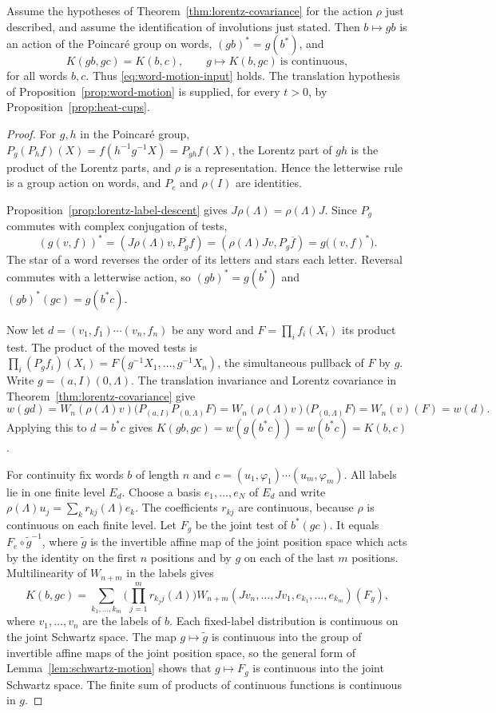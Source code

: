 \begin{corollary}
\label{cor:word-motion-inputs}
Assume the hypotheses of Theorem~\ref{thm:lorentz-covariance} for the
action $\rho$ just described, and assume the identification of involutions
just stated. Then $b\mapsto gb$ is an action of the Poincar\'e group on
words, $(gb)^*=g(b^*)$, and
\[
 K(gb,gc)=K(b,c),\qquad g\longmapsto K(b,gc)\ \text{is continuous},
\]
for all words $b,c$. Thus \eqref{eq:word-motion-input} holds. The
translation hypothesis of Proposition~\ref{prop:word-motion} is supplied,
for every $t>0$, by Proposition~\ref{prop:heat-cups}.
\end{corollary}
\begin{proof}
For $g,h$ in the Poincar\'e group,
$P_g(P_hf)(X)=f(h^{-1}g^{-1}X)=P_{gh}f(X)$, the Lorentz part of $gh$ is
the product of the Lorentz parts, and $\rho$ is a representation. Hence
the letterwise rule is a group action on words, and $P_e$ and $\rho(I)$
are identities.

Proposition~\ref{prop:lorentz-label-descent} gives $J\rho(\Lambda)=\rho(\Lambda)J$.
Since $P_g$ commutes with complex conjugation of tests,
\[
 (g(v,f))^*=(J\rho(\Lambda)v,\overline{P_gf})
          =(\rho(\Lambda)Jv,P_g\overline f)=g\big((v,f)^*\big).
\]
The star of a word reverses the order of its letters and stars each letter.
Reversal commutes with a letterwise action, so $(gb)^*=g(b^*)$ and
$(gb)^*(gc)=g(b^*c)$.

Now let $d=(v_1,f_1)\cdots(v_n,f_n)$ be any word and
$F=\prod_if_i(X_i)$ its product test. The product of the moved tests is
$\prod_i(P_gf_i)(X_i)=F(g^{-1}X_1,\ldots,g^{-1}X_n)$, the simultaneous
pullback of $F$ by $g$. Write $g=(a,I)(0,\Lambda)$. The translation
invariance and Lorentz covariance in Theorem~\ref{thm:lorentz-covariance}
give
\[
 w(gd)=W_n(\rho(\Lambda)v)\big(P_{(a,I)}P_{(0,\Lambda)}F\big)
      =W_n(\rho(\Lambda)v)\big(P_{(0,\Lambda)}F\big)=W_n(v)(F)=w(d).
\]
Applying this to $d=b^*c$ gives $K(gb,gc)=w(g(b^*c))=w(b^*c)=K(b,c)$.

For continuity fix words $b$ of length $n$ and
$c=(u_1,\varphi_1)\cdots(u_m,\varphi_m)$. All labels lie in one finite level $E_d$.
Choose a basis $e_1,\ldots,e_N$ of $E_d$ and write
$\rho(\Lambda)u_j=\sum_kr_{kj}(\Lambda)e_k$. The coefficients $r_{kj}$ are
continuous, because $\rho$ is continuous on each finite level. Let
$F_g$ be the joint test of $b^*(gc)$. It equals $F_e\circ\widetilde g^{-1}$,
where $\widetilde g$ is the invertible affine map of the joint position
space which acts by the identity on the first $n$ positions and by $g$ on
each of the last $m$ positions. Multilinearity of $W_{n+m}$ in the labels
gives
\[
 K(b,gc)=\sum_{k_1,\ldots,k_m}\Big(\prod_{j=1}^mr_{k_jj}(\Lambda)\Big)
   W_{n+m}(Jv_n,\ldots,Jv_1,e_{k_1},\ldots,e_{k_m})(F_g),
\]
where $v_1,\ldots,v_n$ are the labels of $b$. Each fixed-label
distribution is continuous on the joint Schwartz space. The map
$g\mapsto\widetilde g$ is continuous into the group of invertible affine
maps of the joint position space, so the general form of
Lemma~\ref{lem:schwartz-motion} shows that $g\mapsto F_g$ is continuous
into the joint Schwartz space. The finite
sum of products of continuous functions is continuous in $g$.


\end{proof}
